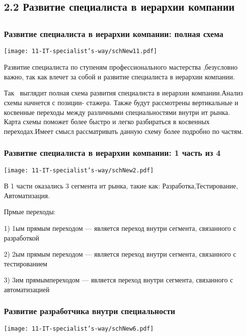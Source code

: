 \documentclass{../industrial-development}
\begin{document}
\subsection{2.2 Развитие  специалиста в иерархии компании  }

\subsection{}

\begin{frame} \frametitle{Развитие  специалиста в иерархии компании: полная схема }
  \centerline{\texttt{[image: 11-IT-specialist's-way/schNew11.pdf]}}
\end{frame}

\lecturenotes

Развитие  специалиста по ступеням профессионального мастерства ,безусловно важно, так как влечет за собой и развитие специалиста в иерархии компании.

Так~\cite{mc} выглядит полная схема развития специалиста в иерархии компании.Анализ схемы начнется с позиции- стажера. Также  будут рассмотрены вертикальные и косвенные переходы между различными специальностями внутри ит рынка. Карта схемы поможет более быстро и легко разбираться в косвенных переходах.Имеет смысл рассматривать данную схему более подробно по частям.

\begin{frame} \frametitle{Развитие  специалиста в иерархии компании: 1 часть из 4 }
  \centerline{\texttt{[image: 11-IT-specialist's-way/schNew2.pdf]}}
\end{frame}

\lecturenotes

В 1 части оказались 3 сегмента ит рынка, такие как: Разработка,Тестирование, Автоматизация.

Прмые переходы:

1) 1ым прямым переходом --- является переход внутри сегмента, связанного с разработкой

2) 2ым прямым переходом --- является переход внутри сегмента, связанного с тестированием

3) 3им прямымпереходом --- является переход внутри сегмента, связанного с автоматизацией


\begin{frame} \frametitle{ Развитие разработчика внутри специальности}
 \centerline{\texttt{[image: 11-IT-specialist's-way/schNew6.pdf]}}
\end{frame}
\end{document}
